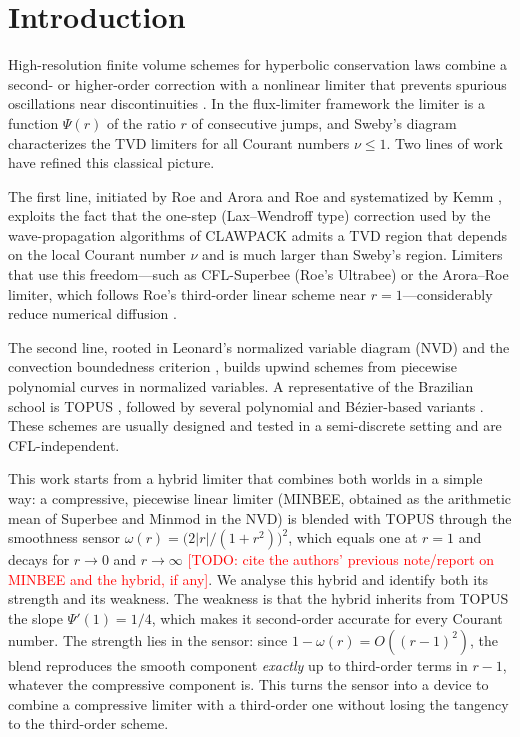 \documentclass[11pt]{article}
\newcommand{\todo}[1]{\textcolor{red}{[TODO: #1]}}
\theoremstyle{plain}
\theoremstyle{definition}
\begin{document}
\section{Introduction}\label{sec:intro}
High-resolution finite volume schemes for hyperbolic conservation laws combine a second- or higher-order correction with a nonlinear limiter that prevents spurious oscillations near discontinuities \cite{Harten1983,Sweby1984,LeVeque2002}. In the flux-limiter framework the limiter is a function $\Psi(r)$ of the ratio $r$ of consecutive jumps, and Sweby's diagram characterizes the TVD limiters for all Courant numbers $\nu\le 1$. Two lines of work have refined this classical picture.

The first line, initiated by Roe \cite{Roe1986} and Arora and Roe \cite{AroraRoe1997} and systematized by Kemm \cite{Kemm2011}, exploits the fact that the one-step (Lax--Wendroff type) correction used by the wave-propagation algorithms of CLAWPACK \cite{LeVeque1997,LeVeque2002,Clawpack} admits a TVD region that depends on the local Courant number $\nu$ and is much larger than Sweby's region. Limiters that use this freedom---such as CFL-Superbee (Roe's Ultrabee) or the Arora--Roe limiter, which follows Roe's third-order linear scheme near $r=1$---considerably reduce numerical diffusion \cite{Kemm2011}.

The second line, rooted in Leonard's normalized variable diagram (NVD) \cite{Leonard1988} and the convection boundedness criterion \cite{GaskellLau1988}, builds upwind schemes from piecewise polynomial curves in normalized variables. A representative of the Brazilian school is TOPUS \cite{Ferreira2012}, followed by several polynomial and B\'ezier-based variants \cite{CaroCandezano2012,Oviedo2023}. These schemes are usually designed and tested in a semi-discrete setting and are CFL-independent.

This work starts from a hybrid limiter that combines both worlds in a simple way: a compressive, piecewise linear limiter (MINBEE, obtained as the arithmetic mean of Superbee and Minmod in the NVD) is blended with TOPUS through the smoothness sensor $\omega(r)=\bigl(2|r|/(1+r^2)\bigr)^2$, which equals one at $r=1$ and decays for $r\to0$ and $r\to\infty$ \todo{cite the authors' previous note/report on MINBEE and the hybrid, if any}. We analyse this hybrid and identify both its strength and its weakness. The weakness is that the hybrid inherits from TOPUS the slope $\Psi'(1)=1/4$, which makes it second-order accurate for every Courant number. The strength lies in the sensor: since $1-\omega(r)=O((r-1)^2)$, the blend reproduces the smooth component \emph{exactly} up to third-order terms in $r-1$, whatever the compressive component is. This turns the sensor into a device to combine a compressive limiter with a third-order one without losing the tangency to the third-order scheme.
\end{document}
